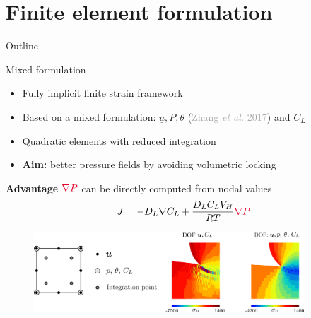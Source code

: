 \documentclass[9pt]{beamer}
\begin{document}
\section{Finite element formulation}

\begin{frame}{Outline}
    \tableofcontents[
        currentsubsection,
        hideothersubsections,
        sectionstyle=show/shaded,
        subsectionstyle=show/shaded,
    ]
\end{frame}




\begin{frame}{Mixed formulation}

    \begin{itemize}
        \item Fully implicit finite strain framework
        \vspace{0.1cm}
        \item Based on a mixed formulation: $\underline{u}, P, \theta$ (\textcolor{darkgray}{Zhang \textit{et al.} 2017}) and $C_L$ 
        \vspace{0.1cm}
        \item Quadratic elements with reduced integration
        \vspace{0.1cm}
        \item \textbf{Aim:} better pressure fields by avoiding volumetric locking
    \end{itemize}

    \begin{block}{\textbf{Advantage}}
        $\textcolor{NewRed}{\nabla P}$ can be directly computed from nodal values
        \begin{equation*}
            J = {-D_L \nabla C_L} + {{\frac{D_L C_L V_H}{RT} \textcolor{NewRed}{\nabla P}}}
        \end{equation*} 
    \end{block}
    
    \vspace{0.1cm}
    
    \begin{figure}
        \centering
        \includegraphics[width=0.9\textwidth]{Images/vol_locking.pdf}
    \end{figure}


\end{frame}
\end{document}
